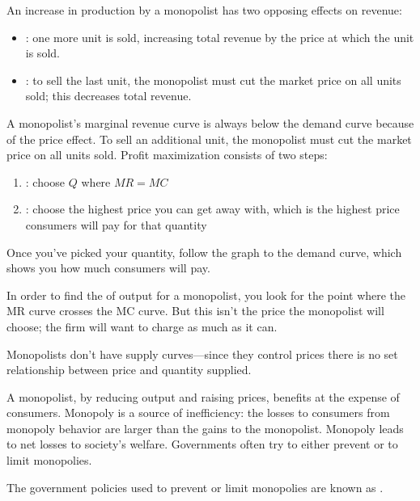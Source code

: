 \documentclass{article}
\begin{document}
An increase in production by a monopolist has two opposing effects on revenue: 
\begin{itemize}
  \item {}: one more unit is sold, increasing total revenue by the price at which the unit is sold. 
  \item {}: to sell the last unit, the monopolist must cut the market price on all units sold; this decreases total revenue.
\end{itemize}

A monopolist's marginal revenue curve is always below the demand curve because of the price effect. To sell an additional unit, the monopolist must cut the market price on all units sold. Profit maximization consists of two steps: 
\begin{enumerate}
  \item {}: choose $Q$ where $MR = MC$
  \item {}: choose the highest price you can get away with, which is the highest price consumers will pay for that quantity
\end{enumerate}

\begin{remark}
  Once you've picked your quantity, follow the graph to the demand curve, which shows you how much consumers will pay.
\end{remark}

In order to find the  of output for a monopolist, you look for the point where the MR curve crosses the MC curve. But this isn't the price the monopolist will choose; the firm will want to charge as much as it can.  

\begin{remark}
  Monopolists don't have supply curves---since they control prices there is no set relationship between price and quantity supplied. 
\end{remark}

A monopolist, by reducing output and raising prices, benefits at the expense of consumers. Monopoly is a source of inefficiency: the losses to consumers from monopoly behavior are larger than the gains to the monopolist. Monopoly leads to net losses to society's welfare. Governments often try to either prevent or to limit monopolies. 

\begin{remark}
  The government policies used to prevent or limit monopolies are known as . 
\end{remark}
\end{document}
